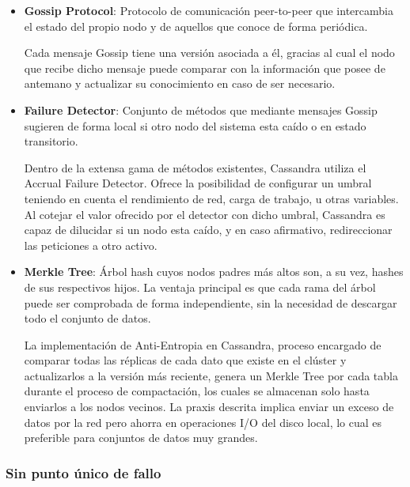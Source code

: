 \begin{itemize}

\item \textbf{Gossip Protocol}\cite{demers1987epidemic}: Protocolo de comunicación peer-to-peer que intercambia el estado del propio nodo y de aquellos que conoce de forma periódica.

Cada mensaje Gossip tiene una versión asociada a él, gracias al cual el nodo que recibe dicho mensaje puede comparar con la información que posee de antemano y actualizar su conocimiento en caso de ser necesario.
	
\item \textbf{Failure Detector}\cite{chandra1996unreliable}: Conjunto de métodos que mediante mensajes Gossip sugieren de forma local si otro nodo del sistema esta caído o en estado transitorio.

Dentro de la extensa gama de métodos existentes, Cassandra utiliza el Accrual Failure Detector\cite{hayashibara2004spl}. Ofrece la posibilidad de configurar un umbral teniendo en cuenta el rendimiento de red, carga de trabajo, u otras variables. Al cotejar el valor ofrecido por el detector con dicho umbral, Cassandra es capaz de dilucidar si un nodo esta caído, y en caso afirmativo, redireccionar las peticiones a otro activo.

\item \textbf{Merkle Tree}\cite{merkle1987digital}: Árbol hash cuyos nodos padres más altos son, a su vez, hashes de sus respectivos hijos. La ventaja principal es que cada rama del árbol puede ser comprobada de forma independiente, sin la necesidad de descargar todo el conjunto de datos.

La implementación de Anti-Entropia\cite{golay1949notes} en Cassandra, proceso encargado de comparar todas las réplicas de cada dato que existe en el clúster y actualizarlos a la versión más reciente, genera un Merkle Tree por cada tabla durante el proceso de compactación, los cuales se almacenan solo hasta enviarlos a los nodos vecinos. La praxis descrita implica enviar un exceso de datos por la red pero ahorra en operaciones I/O del disco local, lo cual es preferible para conjuntos de datos muy grandes.
	
\end{itemize}

\subsubsection{Sin punto único de fallo}

